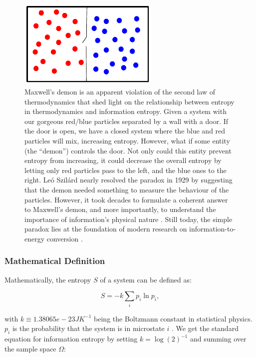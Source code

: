 \documentclass[letterpaper,12pt]{article}
\begin{document}
\begin{figure}[h!]
  \centering\includegraphics[width=0.6\textwidth]{fig2.pdf}

  \caption{Maxwell's demon is an apparent violation of the second law of
  thermodynamics that shed light on the relationship between entropy in
  thermodynamics and information entropy. Given a system with our gorgeous
  red/blue particles separated by a wall with a door. If the door is open,
  we have a closed system where the blue and red particles will mix,
  increasing entropy. However, what if some entity (the ``demon'')  controls
  the door. Not only could this entity prevent entropy from increasing, it
  could decrease the overall entropy by letting only red particles pass to
  the left, and the blue ones to the right. Le\'o Szil\' ard nearly resolved
  the paradox in 1929 by suggesting that the demon needed something to
  measure the behaviour of the particles. However, it took decades to
  formulate a coherent answer to Maxwell's demon, and more importantly, to
  understand the importance of information's physical nature \cite
  {lan96,kar09,gle11}. Still today, the simple paradox lies at the
  foundation of modern research on information-to-energy conversion \cite
  {toy10,wis13}.}

  \label{fig:maxwell}
\end{figure}

\subsubsection{Mathematical Definition}

Mathematically, the entropy $S$ of a system can be defined as:

\begin{equation}
   S = -k\sum_i p_i \ln p_i,
\end{equation}

with $k \equiv 1.38065e-23 J K^{-1}$ being the Boltzmann constant in statistical
physics. $p_i$ is the probability that the system is in microstate $i$ \cite{bol72}. We
get the standard equation for information entropy by setting $k = \log(2)^{-1}$ and
summing over the sample space $\Omega$:
\end{document}
